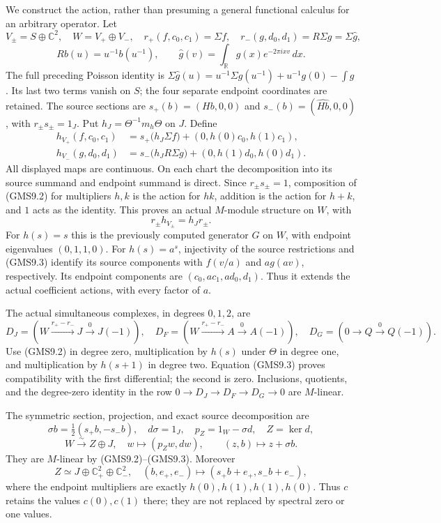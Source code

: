 We construct the action, rather than presuming a general functional
calculus for an arbitrary operator. Let \[
V_\pm=S\oplus\mathbb C^2,\quad W=V_+\oplus V_-,\quad
r_+(f,c_0,c_1)=\Sigma f,\quad
r_-(g,d_0,d_1)=R\Sigma g=\Sigma\widehat g,
\] \[
Rb(u)=u^{-1}b(u^{-1}),\qquad
\widehat g(v)=\int_{\mathbb R}g(x)e^{-2\pi ixv}\,dx.
\tag{GMS9.1}
\] The full preceding Poisson identity is
\(\Sigma\widehat g(u)=u^{-1}\Sigma g(u^{-1})+u^{-1}g(0)-\int g\). Its
last two terms vanish on \(S\); the four separate endpoint coordinates
are retained. The source sections are \(s_+(b)=(Hb,0,0)\) and
\(s_-(b)=(\widehat{Hb},0,0)\), with \(r_\pm s_\pm=1_J\). Put
\(h_J=\Theta^{-1}m_h\Theta\) on \(J\). Define \[
\begin{aligned}
h_{V_+}(f,c_0,c_1)
&=s_+\bigl(h_J\Sigma f\bigr)+(0,h(0)c_0,h(1)c_1),\\
h_{V_-}(g,d_0,d_1)
&=s_-\bigl(h_JR\Sigma g\bigr)+(0,h(1)d_0,h(0)d_1).
\end{aligned}
\tag{GMS9.2}
\] All displayed maps are continuous. On each chart the decomposition
into its source summand and endpoint summand is direct. Since
\(r_\pm s_\pm=1\), composition of (GMS9.2) for multipliers \(h,k\) is
the action for \(hk\), addition is the action for \(h+k\), and \(1\)
acts as the identity. This proves an actual \(M\)-module structure on
\(W\), with \[
r_\pm h_{V_\pm}=h_Jr_\pm.
\tag{GMS9.3}
\] For \(h(s)=s\) this is the previously computed generator \(G\) on
\(W\), with endpoint eigenvalues \((0,1,1,0)\). For \(h(s)=a^s\),
injectivity of the source restrictions and (GMS9.3) identify its source
components with \(f(v/a)\) and \(a g(av)\), respectively. Its endpoint
components are \((c_0,ac_1,ad_0,d_1)\). Thus it extends the actual
coefficient actions, with every factor of \(a\).

The actual simultaneous complexes, in degrees \(0,1,2\), are \[
D_J=(W\xrightarrow{r_+-r_-}J\xrightarrow0J(-1)),\quad
D_F=(W\xrightarrow{r_+-r_-}A\xrightarrow0A(-1)),\quad
D_G=(0\to Q\xrightarrow0Q(-1)).
\tag{GMS9.4}
\] Use (GMS9.2) in degree zero, multiplication by \(h(s)\) under
\(\Theta\) in degree one, and multiplication by \(h(s+1)\) in degree
two. Equation (GMS9.3) proves compatibility with the first differential;
the second is zero. Inclusions, quotients, and the degree-zero identity
in the row \(0\to D_J\to D_F\to D_G\to0\) are \(M\)-linear.

The symmetric section, projection, and exact source decomposition are \[
\sigma b=\tfrac12(s_+b,-s_-b),\quad
d\sigma=1_J,\quad p_Z=1_W-\sigma d,\quad Z=\ker d,
\] \[
W\xrightarrow{\sim}Z\oplus J,\quad w\mapsto(p_Zw,dw),\qquad
(z,b)\mapsto z+\sigma b.
\tag{GMS9.5}
\] They are \(M\)-linear by (GMS9.2)--(GMS9.3). Moreover \[
Z\simeq J\oplus\mathbb C^2_+\oplus\mathbb C^2_-,\quad
(b,e_+,e_-)\mapsto(s_+b+e_+,s_-b+e_-),
\tag{GMS9.6}
\] where the endpoint multipliers are exactly \(h(0),h(1),h(1),h(0)\).
Thus \(c\) retains the values \(c(0),c(1)\) there; they are not replaced
by spectral zero or one values.

